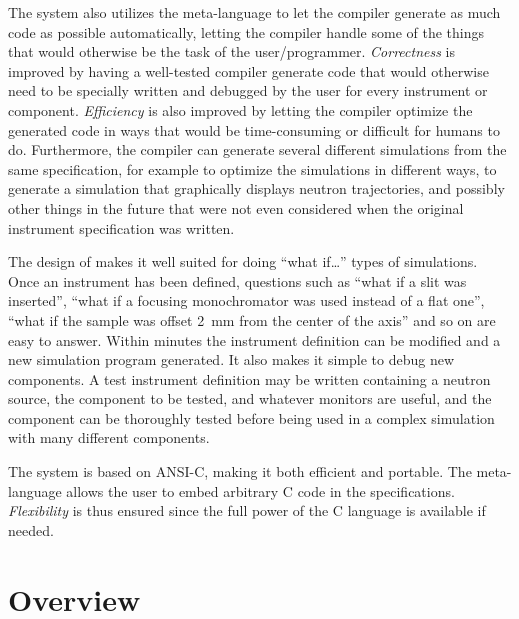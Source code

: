 The \MCS system also utilizes the meta-language to let the \MCS
compiler generate as much code as possible automatically, letting the
compiler handle some of the things that would otherwise be the task of
the user/programmer. \textit{Correctness} is improved by having a well-tested
compiler generate code that would otherwise need to be specially written
and debugged by the user for every instrument or component. \textit{Efficiency}
is also improved by letting the compiler optimize the generated code in
ways that would be time-consuming or difficult for humans to do. Furthermore, the
compiler can generate several different simulations from the same
specification, for example to optimize the simulations in different
ways, to generate a simulation that graphically displays neutron
trajectories, and possibly other things in the future that were not even
considered when the original instrument specification was written.

The design of \MCS makes it well suited for doing ``what if\ldots''
types of simulations. Once an instrument has been defined, questions
such as ``what if a slit was inserted'', ``what if a focusing
monochromator was used instead of a flat one'', ``what if the sample was
offset 2~mm from the center of the axis'' and so on are easy to answer. Within
minutes the instrument definition can be modified and a
new simulation program generated. It also makes it simple to debug new
components. A test instrument definition may be written
containing a neutron source, the component to be tested, and whatever
monitors are useful, and the component can be thoroughly tested before
being used in a complex simulation with many different components.

The \MCS system is based on ANSI-C, making it both efficient and
portable. The meta-language allows the user to embed arbitrary C code in
the specifications. \textit{Flexibility} is thus ensured since the full
power of the C language is available if needed.


\section{Overview}

